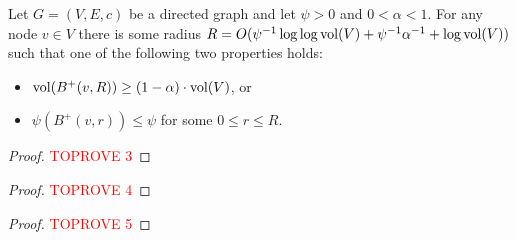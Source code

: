 \begin{lemma} \label{lem:lopsided-expansion-boosted}
Let $G = (V, E, c)$ be a directed graph and let $\psi > 0$ and $0 < \alpha < 1$. For any node $v \in V$ there is some radius $R = O(\psi^{-1} \log\log \operatorname{vol}(V) + \psi^{-1} \alpha^{-1} + \log \operatorname{vol}(V))$ such that one of the following two properties holds:
\begin{itemize}
	\item $\operatorname{vol}(B^+(v, R)) \geq (1 - \alpha) \cdot \operatorname{vol}(V)$, or
	\item $\psi(B^+(v, r)) \leq \psi$ for some $0 \leq r \leq R$.
\end{itemize}
\end{lemma}
\begin{proof}\textcolor{red}{TOPROVE 3}\end{proof}

\lemLexpDiam*

\begin{proof}\textcolor{red}{TOPROVE 4}\end{proof}

\begin{proof}\textcolor{red}{TOPROVE 5}\end{proof}
